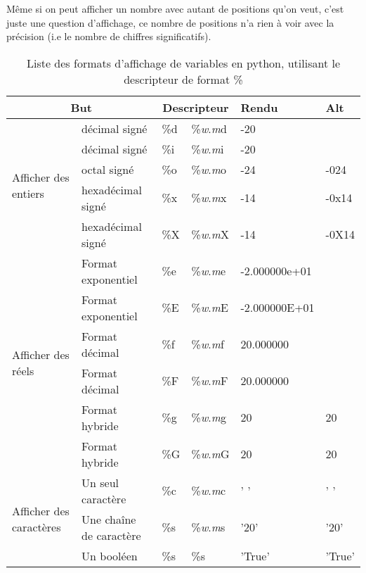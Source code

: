 \documentclass[a4paper,twoside]{article}
\begin{document}
Même si on peut afficher un nombre avec autant de positions qu'on veut, c'est juste une question d'affichage, ce nombre de positions n'a rien à voir avec la précision (i.e le nombre de chiffres significatifs). 
\begin{table}
\begin{center}
\begin{tabular}{|p{2cm}|l||l|l|l|l|}
\hline
\multicolumn{2}{|c||}{But} & \multicolumn{2}{c|}{Descripteur} & Rendu & Alt\\\hline
\multirow{5}{2cm}{Afficher des entiers} & décimal signé & \%d & \%\emph{w}.\emph{m}d & -20 &\\\cline{2-6}
 & décimal signé & \%i & \%\emph{w}.\emph{m}i & -20 &\\\cline{2-6}
 & octal signé & \%o & \%\emph{w}.\emph{m}o & -24 & -024\\\cline{2-6}
 & hexadécimal signé & \%x & \%\emph{w}.\emph{m}x & -14 & -0x14\\\cline{2-6}
 & hexadécimal signé & \%X & \%\emph{w}.\emph{m}X & -14 & -0X14\\\hline
\multirow{6}{2cm}{Afficher des réels} & Format exponentiel & \%e & \%\emph{w}.\emph{m}e & -2.000000e+01 & \footnotemark[103]\\\cline{2-6}
 & Format exponentiel & \%E & \%\emph{w}.\emph{m}E & -2.000000E+01 & \footnotemark[103]\\\cline{2-6}
 & Format décimal & \%f & \%\emph{w}.\emph{m}f & 20.000000 & \footnotemark[103]\\\cline{2-6}
 & Format décimal & \%F & \%\emph{w}.\emph{m}F & 20.000000 & \footnotemark[103]\\\cline{2-6}
 & Format hybride \footnotemark[101] & \%g & \%\emph{w}.\emph{m}g & 20 & 20\footnotemark[104]\\\cline{2-6}
 & Format hybride \footnotemark[101] & \%G & \%\emph{w}.\emph{m}G & 20 & 20\footnotemark[104]\\\hline
\multirow{3}{2cm}{Afficher des caractères} & Un seul caractère \footnotemark[102] & \%c & \%\emph{w}.\emph{m}c & ' ' & ' '\\\cline{2-6}
 & Une chaîne de caractère & \%s & \%\emph{w}.\emph{m}s & '20' & '20'\\\cline{2-6}
 & Un booléen & \%s & \%s & 'True' & 'True'\\\hline
\end{tabular}
\end{center}
\caption{Liste des formats d'affichage de variables en python, utilisant le descripteur de format \%}\label{tab:formats}
\end{table}
\end{document}
